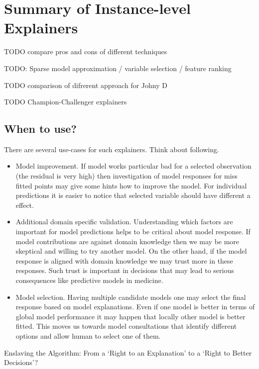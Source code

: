 \documentclass[12pt,]{krantz}
\providecommand{\tightlist}{%
  \setlength{\itemsep}{0pt}\setlength{\parskip}{0pt}}
\theoremstyle{definition}
\theoremstyle{definition}
\theoremstyle{definition}
\theoremstyle{remark}
\begin{document}
\hypertarget{summaryInstanceLevel}{%
\section{Summary of Instance-level
Explainers}\label{summaryInstanceLevel}}

TODO compare pros and cons of different techniques

TODO: Sparse model approximation / variable selection / feature ranking

TODO comparison of difrerent approach for Johny D

TODO Champion-Challenger explainers

\hypertarget{when-to-use}{%
\subsection{When to use?}\label{when-to-use}}

There are several use-cases for such explainers. Think about following.

\begin{itemize}
\tightlist
\item
  Model improvement. If model works particular bad for a selected
  observation (the residual is very high) then investigation of model
  responses for miss fitted points may give some hints how to improve
  the model. For individual predictions it is easier to notice that
  selected variable should have different a effect.
\item
  Additional domain specific validation. Understanding which factors are
  important for model predictions helps to be critical about model
  response. If model contributions are against domain knowledge then we
  may be more skeptical and willing to try another model. On the other
  hand, if the model response is aligned with domain knowledge we may
  trust more in these responses. Such trust is important in decisions
  that may lead to serious consequences like predictive models in
  medicine.
\item
  Model selection. Having multiple candidate models one may select the
  final response based on model explanations. Even if one model is
  better in terms of global model performance it may happen that locally
  other model is better fitted. This moves us towards model
  consultations that identify different options and allow human to
  select one of them.
\end{itemize}

Enslaving the Algorithm: From a `Right to an Explanation' to a `Right to
Better Decisions'? \citep{Edwards_Veale_2018}
\end{document}
